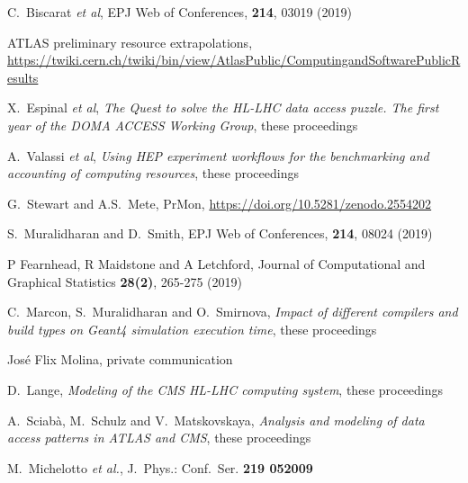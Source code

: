 \begin{thebibliography}{}

C.~Biscarat {\em et al}, EPJ Web of Conferences, \textbf{214}, 03019 (2019)

ATLAS preliminary resource extrapolations, \url{https://twiki.cern.ch/twiki/bin/view/AtlasPublic/ComputingandSoftwarePublicResults}

X.~Espinal {\em et al}, \textit{The Quest to solve the HL-LHC data access puzzle. The first year of the DOMA ACCESS Working Group}, these proceedings

A.~Valassi {\em et al}, \textit{Using HEP experiment workflows for the benchmarking and accounting of computing resources}, these proceedings

G.~Stewart and A.S.~Mete, PrMon, \url{https://doi.org/10.5281/zenodo.2554202}

S.~Muralidharan and D.~Smith, EPJ Web of Conferences, \textbf{214}, 08024 (2019)

P Fearnhead, R Maidstone and A Letchford, Journal of Computational and Graphical Statistics \textbf{28(2)}, 265-275 (2019)

C.~Marcon, S.~Muralidharan and O.~Smirnova, \textit{Impact of different compilers and build types on Geant4 simulation execution time}, these proceedings

 Jos\'e Flix Molina, private communication

D.~Lange, \textit{Modeling of the CMS HL-LHC computing system}, these proceedings

A.~Sciab\`a, M.~Schulz and V.~Matskovskaya, \textit{Analysis and modeling of data access patterns in ATLAS and CMS}, these proceedings

M.~Michelotto \emph{et al.}, J.~Phys.: Conf.~Ser. \bf{219} 052009
\end{thebibliography}
